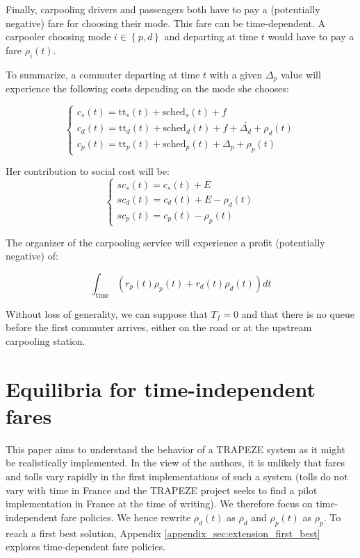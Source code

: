\documentclass[english, a4paper]{article}
\theoremstyle{plain}
\theoremstyle{definition}
\theoremstyle{remark}
\begin{document}
Finally, carpooling drivers and passengers both have to pay a (potentially negative) fare for choosing their mode. This fare can be time-dependent. A carpooler choosing mode $i \in \left\{ p, d \right\}$ and departing at time $t$ would have to pay a fare $\rho _i (t)$.

To summarize, a commuter departing at time $t$ with a given $\Delta _p$ value will experience the following costs depending on the mode she chooses:

\begin{equation}
\left\{
\begin{array}{l}
    c_s(t) = \text{tt}_s(t) + \text{sched}_s(t) + f\\
    c_d(t) = \text{tt}_d(t) + \text{sched}_d(t) + f + \overline{\Delta _d} + \rho _d (t)\\
    c_p(t) = \text{tt}_p(t) + \text{sched}_p(t) + \Delta _p + \rho _p (t)
\end{array}
\right.
\end{equation}

Her contribution to social cost will be:
\begin{equation}
    \left\{
    \begin{array}{l}
        sc_s(t) = c_s(t) + E\\
        sc_d(t) = c_d(t) + E - \rho _d (t)\\
        sc_p(t) = c_p(t) - \rho _p(t)
    \end{array}
    \right.
\end{equation}

The organizer of the carpooling service will experience a profit (potentially negative) of:

\begin{equation}
    \int_{\text{time}} (r_p(t) \rho _p(t) + r_d(t) \rho _d(t)) dt
\end{equation}

Without loss of generality, we can suppose that $T_f = 0$ and that there is no queue before the first commuter arrives, either on the road or at the upstream carpooling station.


\section{Equilibria for time-independent fares} %

This paper aims to understand the behavior of a TRAPEZE system as it might be realistically implemented. In the view of the authors, it is unlikely that fares and tolls vary rapidly in the first implementations of such a system (tolls do not vary with time in France and the TRAPEZE project seeks to find a pilot implementation in France at the time of writing). We therefore focus on time-independent fare policies. We hence rewrite $\rho _d(t)$ as $\rho _d$ and $\rho _p(t)$ as $\rho _p$. To reach a first best solution, Appendix \ref{appendix_sec:extension_first_best} explores time-dependent fare policies.
\end{document}
